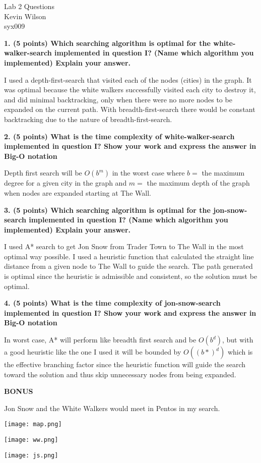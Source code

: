 \documentclass[12pt]{elsart}
\begin{document}
\begin{center}
Lab 2 Questions \\
Kevin Wilson \\
syx009
\end{center}
  
{\bf 1. (5 points) Which searching algorithm is optimal for the white-walker-search implemented in question I? (Name which algorithm you implemented) Explain your answer.}

I used a depth-first-search that visited each of the nodes (cities) in the graph. It was optimal because the white walkers successfully visited each city to destroy it, and did minimal backtracking, only when there were no more nodes to be expanded on the current path. With breadth-first-search there would be constant backtracking due to the nature of breadth-first-search.

{\bf 2. (5 points) What is the time complexity of white-walker-search implemented in question I? Show your work and express the answer in Big-O notation}

Depth first search will be $O(b^m)$ in the worst case where $b =$ the maximum degree for a given city in the graph and $m =$ the maximum depth of the graph when nodes are expanded starting at The Wall.

{\bf 3. (5 points) Which searching algorithm is optimal for the jon-snow-search implemented in question I? (Name which algorithm you implemented) Explain your answer.}

I used A* search to get Jon Snow from Trader Town to The Wall in the most optimal way possible. I used a heuristic function that calculated the straight line distance from a given node to The Wall to guide the search. The path generated is optimal since the heuristic is admissible and consistent, so the solution must be optimal.

{\bf 4. (5 points) What is the time complexity of jon-snow-search implemented in question I? Show your work and express the answer in Big-O notation}

In worst case, A* will perform like breadth first search and be $O(b^d)$, but with a good heuristic like the one I used it will be bounded by $O((b*)^d)$ which is the effective branching factor since the heuristic function will guide the search toward the solution and thus skip unnecessary nodes from being expanded.

{\bf BONUS}

Jon Snow and the White Walkers would meet in Pentos in my search.

\texttt{[image: map.png]}

\texttt{[image: ww.png]}

\texttt{[image: js.png]}
\end{document}
